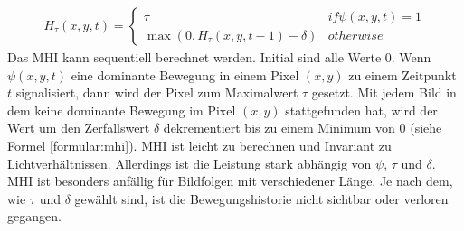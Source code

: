 \begin{align}
    H_{\tau}(x,y,t) = \begin{cases}
                          \tau & if \psi(x,y,t) = 1 \\
                          \max(0, H_{\tau}(x,y,t-1) - \delta) & otherwise
    \end{cases}
    \label{formular:mhi}
\end{align}
Das MHI kann sequentiell berechnet werden. Initial sind alle Werte 0. Wenn $\psi(x,y,t)$ eine dominante Bewegung in einem Pixel $(x,y)$ zu einem Zeitpunkt $t$ signalisiert, dann wird der Pixel zum Maximalwert $\tau$
gesetzt. Mit jedem Bild in dem keine dominante Bewegung im Pixel $(x,y)$ stattgefunden hat, wird der Wert um den Zerfallswert $\delta$ dekrementiert bis zu einem Minimum von 0 (siehe Formel \ref{formular:mhi}).
\newline
\newline
MHI ist leicht zu berechnen und Invariant zu Lichtverhältnissen. Allerdings ist die Leistung stark abhängig von $\psi$, $\tau$ und $\delta$. MHI ist besonders anfällig für Bildfolgen mit verschiedener Länge.
Je nach dem, wie $\tau$ und $\delta$ gewählt sind, ist die Bewegungshistorie nicht sichtbar oder verloren gegangen.